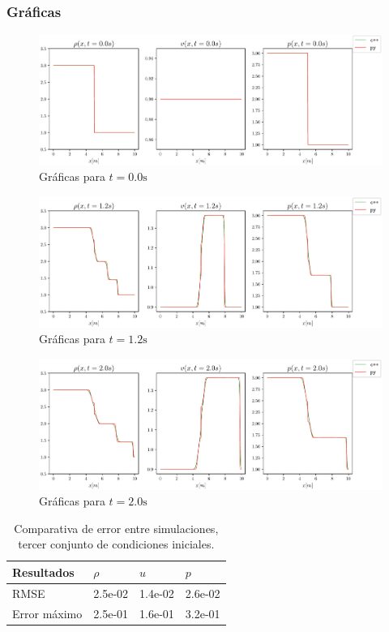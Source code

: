\subsubsection{Gráficas}
\begin{figure}[H]
	\centering
	\includegraphics[width=1\linewidth]{../euler1D/plots_en_TDG/py_sin_claw/py_leveque518/1.pdf}
	\caption{Gráficas para $t=0.0\unit{\s}$}
\end{figure}
\begin{figure}[H]
	\centering
	\includegraphics[width=1\linewidth]{../euler1D/plots_en_TDG/py_sin_claw/py_leveque518/4.pdf}
	\caption{Gráficas para $t=1.2\unit{\s}$}
\end{figure}
\begin{figure}[H]
	\centering
	\includegraphics[width=1\linewidth]{../euler1D/plots_en_TDG/py_sin_claw/py_leveque518/6.pdf}
	\caption{Gráficas para $t=2.0\unit{\s}$}
\end{figure}
\begin{table}[H]
	\large
	\centering
	\begin{tabular}{|l|l|l|l|}
		\hline
		Resultados & $\rho$ & $u$ & $p$ \\ \hline
		RMSE & 2.5e-02 & 1.4e-02 & 2.6e-02 \\ \hline
		Error máximo & 2.5e-01 & 1.6e-01 & 3.2e-01 \\ \hline
	\end{tabular}
	\caption{Comparativa de error entre simulaciones, tercer conjunto de condiciones iniciales.}
\end{table}
